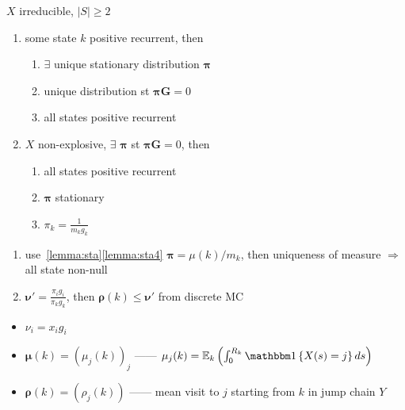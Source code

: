 \begin{thm}
    $X$ irreducible, $|S|\geq 2$
    \begin{enumerate}
        \item some state $k$ positive recurrent, then
        \begin{enumerate}
            \item $\exists$ unique stationary distribution $\bm \pi$
            \item unique distribution st $\bm \pi \bm G = 0$
            \item all states positive recurrent
        \end{enumerate}
        \item $X$ non-explosive, $\exists$ $\bm \pi$ st $\bm \pi \bm G = 0$, then
        \begin{enumerate}
            \item all states positive recurrent
            \item $\bm \pi$ stationary
            \item $\pi_k = \frac{1}{m_k g_k}$
        \end{enumerate}
    \end{enumerate}
\end{thm}
\begin{pf}
    \begin{enumerate}
        \item use~\ref{lemma:sta}\ref{lemma:sta4} $\bm \pi = \mu(k)/m_k$, then uniqueness of measure $\Rightarrow$ all state non-null
        \item $\bm \nu' = \frac{\pi_i g_i}{\pi_k g_k}$, then $\bm \rho(k) \leq \bm\nu'$ from discrete MC
    \end{enumerate}
\end{pf}


\begin{itemize}
    \item $\nu_i = x_i g_i$
    \item $\bm \mu(k) = (\mu_j(k))_j$ ------ $\mu_j(k) = \Ex_k\left( \int^{R_k}_0 \In \left\{ X(s) = j \right\} ds \right)$
    \item $\bm \rho(k) = (\rho_j(k))$ ------ mean visit to $j$ starting from $k$ in jump chain $Y$
\end{itemize}

